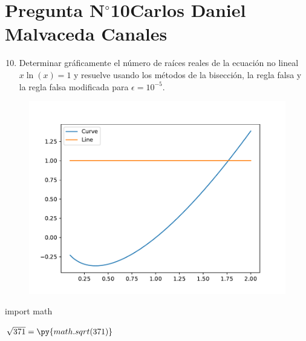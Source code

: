 \section{Pregunta N$^{\circ}$10\qquad Carlos Daniel Malvaceda Canales}

\begin{frame}
	\begin{enumerate}\setcounter{enumi}{9}
		\item

		      Determinar gráficamente el número de raíces reales de la
		      ecuación no lineal
		      \begin{math}
			      x\ln\left(x\right)=
			      1
		      \end{math}
		      y resuelve usando los métodos de la bisección, la regla
		      falsa y la regla falsa modificada para $\epsilon=10^{-5}$.
	\end{enumerate}

	\begin{solution}

		\begin{figure}
			\includegraphics[width=0.5\paperwidth]{p10.pdf}
		\end{figure}

	\end{solution}
\end{frame}

\begin{python}
	import math
\end{python}

\begin{frame}
	\begin{solution}
		$\sqrt{371} = \py{math.sqrt(371)}$
	\end{solution}
\end{frame}